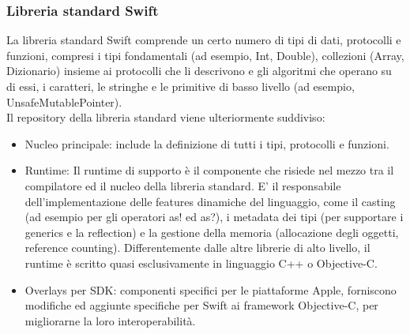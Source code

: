 \subsubsection{Libreria standard Swift}
La libreria standard Swift comprende un certo numero di tipi di dati, protocolli e funzioni, compresi i tipi fondamentali (ad esempio, Int, Double), collezioni (Array, Dizionario) insieme ai protocolli che li descrivono e gli algoritmi che operano su di essi, i caratteri, le stringhe e le primitive di basso livello (ad esempio, UnsafeMutablePointer).\\
Il repository della libreria standard viene ulteriormente suddiviso:
\begin{itemize}
\item Nucleo principale: include la definizione di tutti i tipi, protocolli e funzioni.
\item Runtime: Il runtime di supporto è il componente che risiede nel mezzo tra il compilatore ed il nucleo della libreria standard. E' il responsabile dell'implementazione delle features dinamiche del linguaggio, come il casting  (ad esempio per gli operatori as! ed as?), i metadata dei tipi (per supportare i generics e la reflection) e la gestione della memoria (allocazione degli oggetti, reference counting). Differentemente dalle altre librerie di alto livello, il runtime è scritto quasi esclusivamente in linguaggio C++ o Objective-C.
\item Overlays per SDK: componenti specifici per le piattaforme Apple, forniscono modifiche ed aggiunte specifiche per Swift ai framework Objective-C, per migliorarne la loro interoperabilità. 
\end{itemize}
